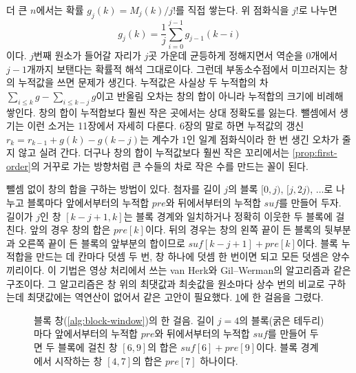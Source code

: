 더 큰 $n$에서는 확률 $g_j(k)=M_j(k)/j!$를 직접 쌓는다. 위 점화식을 $j!$로 나누면
\[
g_j(k)=\frac1j\sum_{i=0}^{j-1}g_{j-1}(k-i)
\]
이다. $j$번째 원소가 들어갈 자리가 $j$곳 가운데 균등하게 정해지면서 역순을 $0$개에서 $j-1$개까지 보탠다는 확률적 해석 그대로이다. 그런데 부동소수점에서 미끄러지는 창의 누적값을 쓰면 문제가 생긴다. 누적값은 사실상 두 누적합의 차 $\sum_{i\le k}g-\sum_{i\le k-j}g$이고 반올림 오차는 창의 합이 아니라 누적합의 크기에 비례해 쌓인다. 창의 합이 누적합보다 훨씬 작은 곳에서는 상대 정확도를 잃는다. 뺄셈에서 생기는 이런 소거는 11장에서 자세히 다룬다. 6장의 말로 하면 누적값의 갱신 $r_k=r_{k-1}+g(k)-g(k-j)$는 계수가 $1$인 일계 점화식이라 한 번 생긴 오차가 줄지 않고 실려 간다. 더구나 창의 합이 누적값보다 훨씬 작은 꼬리에서는 \cref{prop:first-order}의 거꾸로 가는 방향처럼 큰 수들의 차로 작은 수를 만드는 꼴이 된다.

뺄셈 없이 창의 합을 구하는 방법이 있다. 첨자를 길이 $j$의 블록 $[0,j)$, $[j,2j)$, $\dots$로 나누고 블록마다 앞에서부터의 누적합 $\mathit{pre}$와 뒤에서부터의 누적합 $\mathit{suf}$를 만들어 두자. 길이가 $j$인 창 $[k-j+1,k]$는 블록 경계와 일치하거나 정확히 이웃한 두 블록에 걸친다. 앞의 경우 창의 합은 $\mathit{pre}[k]$이다. 뒤의 경우는 창의 왼쪽 끝이 든 블록의 뒷부분과 오른쪽 끝이 든 블록의 앞부분의 합이므로 $\mathit{suf}[k-j+1]+\mathit{pre}[k]$이다. 블록 누적합을 만드는 데 칸마다 덧셈 두 번, 창 하나에 덧셈 한 번이면 되고 모든 덧셈은 양수끼리이다. 이 기법은 영상 처리에서 쓰는 van Herk와 Gil--Werman의 알고리즘과 같은 구조이다\cite{vanherk1992,gil1993}. 그 알고리즘은 창 위의 최댓값과 최솟값을 원소마다 상수 번의 비교로 구하는데 최댓값에는 역연산이 없어서 같은 고안이 필요했다. \cref{fig:block-window}에 한 걸음을 그렸다.

\begin{figure}[htbp]
\centering
{}
\caption{블록 창(\cref{alg:block-window})의 한 걸음. 길이 $j=4$의 블록(굵은 테두리)마다 앞에서부터의 누적합 $\mathit{pre}$와 뒤에서부터의 누적합 $\mathit{suf}$를 만들어 두면 두 블록에 걸친 창 $[6,9]$의 합은 $\mathit{suf}[6]+\mathit{pre}[9]$이다. 블록 경계에서 시작하는 창 $[4,7]$의 합은 $\mathit{pre}[7]$ 하나이다.}
\label{fig:block-window}
\end{figure}

